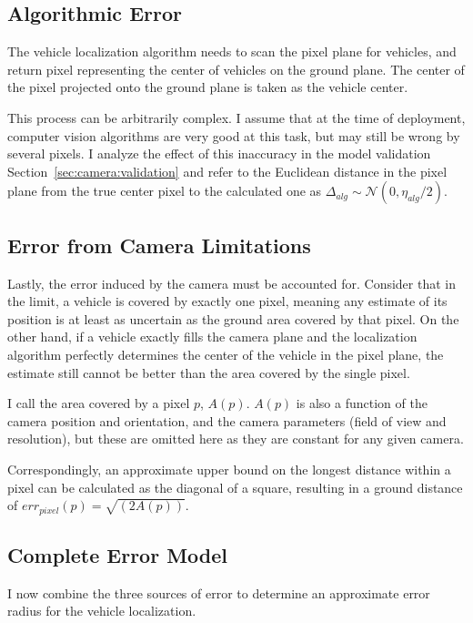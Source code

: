 \documentclass[a4paper,12pt,twoside,openright]{report}
\begin{document}
\subsection{Algorithmic Error}

The vehicle localization algorithm needs to scan the pixel plane for vehicles,
and return pixel representing the center of vehicles on the ground plane.
The center of the pixel projected onto the ground plane is taken as the vehicle center.

This process can be arbitrarily complex. I assume that at the time of deployment, 
computer vision algorithms are very good at this task, but may still
be wrong by several pixels. I analyze the effect of this inaccuracy
in the model validation Section~\ref{sec:camera:validation} and refer to the Euclidean distance
in the pixel plane from the true center pixel to the calculated one
as $\Delta_{alg} \sim \mathcal{N}(0, \eta_{alg}/2)$.

\subsection{Error from Camera Limitations}

Lastly, the error induced by the camera must be accounted for. Consider that 
in the limit, a vehicle is covered by exactly one pixel, meaning any estimate
of its position is at least as uncertain as the ground area 
covered by that pixel. On the other hand, if a vehicle
exactly fills the camera plane and the localization algorithm perfectly determines
the center of the vehicle in the pixel plane, the estimate still cannot
be better than the area covered by the single pixel.

I call the area covered by a pixel $p$, $A(p)$. $A(p)$ is also a function of the camera
position and orientation, and the camera parameters (field of view and resolution),
but these are omitted here as they are constant for any given camera.

Correspondingly, an approximate upper bound on the longest distance
within a pixel can be calculated as the diagonal of a square,
resulting in a ground distance of $err_{pixel}(p) = \sqrt{(2A(p))}$. 


\subsection{Complete Error Model}
\label{sec:cameramodel:r}

I now combine the three sources of error to determine an approximate
error radius for the vehicle localization.
\end{document}
